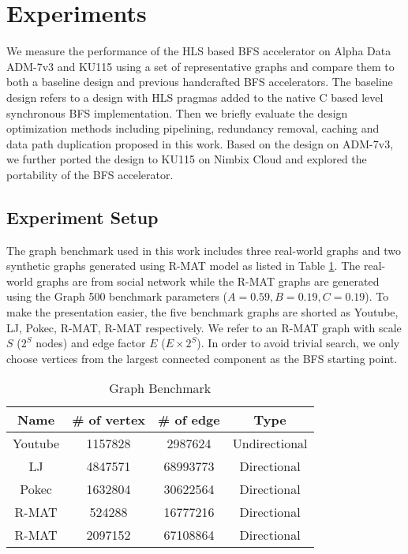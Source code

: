 \section{Experiments} \label{sec:experiment}
We measure the performance of the HLS based BFS 
accelerator on Alpha Data ADM-7v3 and KU115 using a set of 
representative graphs and compare them to both a 
baseline design and previous handcrafted BFS accelerators. 
The baseline design refers to a design with HLS pragmas 
added to the native C based level synchronous BFS implementation. 
Then we briefly evaluate the design optimization 
methods including pipelining, redundancy removal, 
caching and data path duplication 
proposed in this work. Based on the design on ADM-7v3, 
we further ported the design 
to KU115 on Nimbix Cloud and explored the portability of the 
BFS accelerator. 

\subsection{Experiment Setup}
The graph benchmark used in this work includes three real-world graphs and 
two synthetic graphs generated using R-MAT model \cite{chakrabarti2004rmat} 
as listed in Table \ref{tab:graph}. The real-world graphs are from social network 
\cite{snapnets} while the R-MAT graphs are generated 
using the Graph 500 benchmark parameters ($A=0.59, B=0.19, C=0.19$). To make the 
presentation easier, the five benchmark graphs are shorted as Youtube, 
LJ, Pokec, R-MAT\uppercase\expandafter{}, 
R-MAT\uppercase\expandafter{} respectively. We refer 
to an R-MAT graph with scale $S$ ($2^{S}$ nodes) and edge factor $E$ ($E\times 2^{S}$). 
In order to avoid trivial search, we only choose vertices from the largest 
connected component as the BFS starting point.

\begin{table}
    \centering
  \vspace{-0.3em}
  \caption{Graph Benchmark}
  \label{tab:graph}
  \vspace{-0.3em}
  \begin{tabular}{cccc}
    \toprule
      Name & \# of vertex & \# of edge & Type \\
    \midrule
      Youtube & 1157828 & 2987624 & Undirectional \\
      LJ & 4847571 & 68993773 & Directional \\
      Pokec & 1632804 & 30622564 & Directional \\
      R-MAT\uppercase\expandafter{\romannumeral1} & 524288 & 16777216 & Directional \\
      R-MAT\uppercase\expandafter{\romannumeral2} & 2097152 & 67108864 & Directional \\
  \bottomrule
\end{tabular}
\vspace{-1em}
\end{table}

